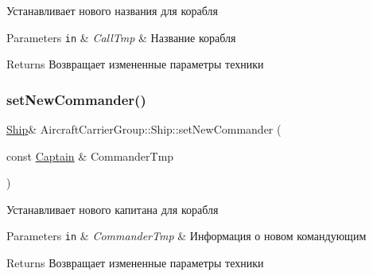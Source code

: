 Устанавливает нового названия для корабля 


\begin{DoxyParams}[1]{Parameters}
\mbox{\tt in}  & {\em Call\+Tmp} & Название корабля \\
\hline
\end{DoxyParams}
\begin{DoxyReturn}{Returns}
Возвращает измененные параметры техники 
\end{DoxyReturn}
\mbox{\label{class_aircraft_carrier_group_1_1_ship_a9122d6ab9856112fbffed3c5545be8d9}} 
\subsubsection{\texorpdfstring{set\+New\+Commander()}{setNewCommander()}}
{\footnotesize\ttfamily \mbox{\hyperlink{class_aircraft_carrier_group_1_1_ship}{Ship}}\& Aircraft\+Carrier\+Group\+::\+Ship\+::set\+New\+Commander (\begin{DoxyParamCaption}\item[{const \mbox{\hyperlink{struct_aircraft_carrier_group_1_1_captain}{Captain}} \&}]{Commander\+Tmp }\end{DoxyParamCaption})\hspace{0.3cm}{\ttfamily [inline]}}



Устанавливает нового капитана для корабля 


\begin{DoxyParams}[1]{Parameters}
\mbox{\tt in}  & {\em Commander\+Tmp} & Информация о новом командующим \\
\hline
\end{DoxyParams}
\begin{DoxyReturn}{Returns}
Возвращает измененные параметры техники 
\end{DoxyReturn}
\mbox{\label{class_aircraft_carrier_group_1_1_ship_aa1e00421319d3a35948f899d33d4bc06}} 
